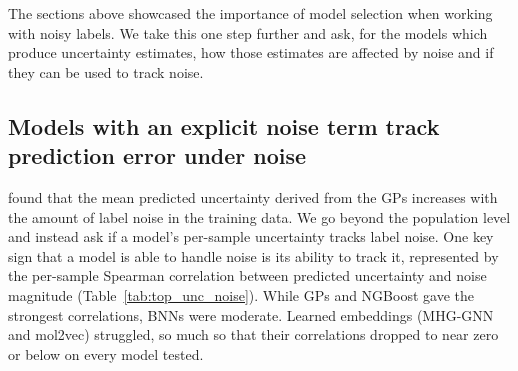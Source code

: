 The sections above showcased the importance of model selection when working with noisy labels. We take this one step further and ask, for the models which produce uncertainty estimates, how those estimates are affected by noise and if they can be used to track noise. 

\subsection{Models with an explicit noise term track prediction error under noise}

\citet{Kolmar2021} found that the mean predicted uncertainty derived from the GPs increases with the amount of label noise in the training data. We go beyond the population level and instead ask if a model's per-sample uncertainty tracks label noise. One key sign that a model is able to handle noise is its ability to track it, represented by the per-sample Spearman correlation between predicted uncertainty and noise magnitude (Table~\ref{tab:top_unc_noise}). While GPs and NGBoost gave the strongest correlations, BNNs were moderate. Learned embeddings (MHG-GNN and mol2vec) struggled, so much so that their correlations dropped to near zero or below on every model tested. 

